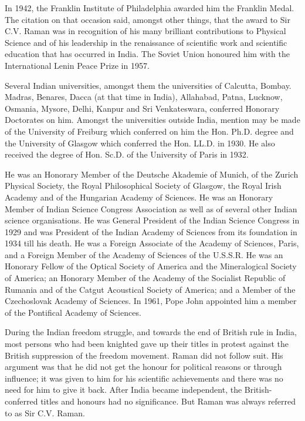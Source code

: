 In 1942, the Franklin Institute of Philadelphia awarded him the Franklin Medal. The citation on that occasion said, amongst other things, that the award to Sir C.V. Raman was in recognition of his many brilliant contributions to Physical Science and of his leadership in the renaissance of scientific work and scientific education that has occurred in India. The Soviet Union honoured him with the International Lenin Peace Prize in 1957.

Several Indian universities, amongst them the universities of Calcutta, Bombay. Madras, Benares, Dacca (at that time in India), Allahabad, Patna, Lucknow, Osmania, Mysore, Delhi, Kanpur and Sri Venkateswara, conferred Honorary Doctorates on him. Amongst the universities outside India, mention may be made of the University of Freiburg which conferred on him the Hon. Ph.D. degree and the University of Glasgow which conferred the Hon. LL.D. in 1930. He also received the degree of Hon. Sc.D. of the University of Paris in 1932.

He was an Honorary Member of the Deutsche Akademie of Munich, of the Zurich Physical Society, the Royal Philosophical Society of Glasgow, the Royal Irish Academy and of the Hungarian Academy of Sciences. He was an Honorary Member of Indian Science Congress Association as well as of several other Indian science organisations. He was General President of the Indian Science Congress in 1929 and was President of the Indian Academy of Sciences from its foundation in 1934 till his death. He was a Foreign Associate of the Academy of Sciences, Paris, and a Foreign Member of the Academy of Sciences of the U.S.S.R. He was an Honorary Fellow of the Optical Society of America and the Mineralogical Society of America; an Honorary Member of the Academy of the Socialist Republic of Rumania and of the Catgut Acoustical Society of America; and a Member of the Czechoslovak Academy of Sciences. In 1961, Pope John appointed him a member of the Pontifical Academy of Sciences.

During the Indian freedom struggle, and towards the end of British rule in India, most persons who had been knighted gave up their titles in protest against the British suppression of the freedom movement. Raman did not follow suit. His argument was that he did not get the honour for political reasons or through influence; it was given to him for his scientific achievements and there was no need for him to give it back. After India became independent, the British-conferred titles and honours had no significance. But Raman was always referred to as Sir C.V. Raman.

